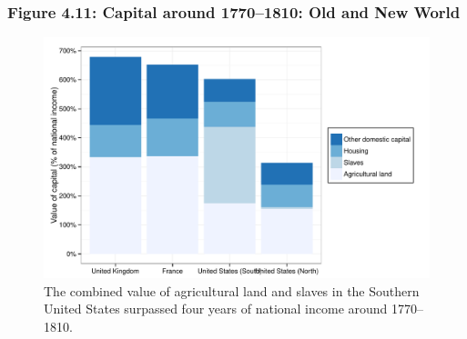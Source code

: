 \documentclass[t]{beamer}\usepackage[]{graphicx}\usepackage[]{color}
\newenvironment{knitrout}{}{} %
\begin{document}
\begin{frame}[label=Figure_4_11]
\frametitle{Figure 4.11: Capital around 1770--1810: Old and New World}
\begin{figure}[t]
\begin{minipage}[b]{\textwidth}
\centering
\begin{knitrout}\footnotesize
{}\color{fgcolor}

{\centering \includegraphics[width=1\linewidth]{figures/color/Figure_4_11} 

}



\end{knitrout}
\caption{The combined value of agricultural land and slaves in the Southern United States surpassed four years of national income around 1770--1810.}
\end{minipage}
\end{figure}
\end{frame}
\end{document}
